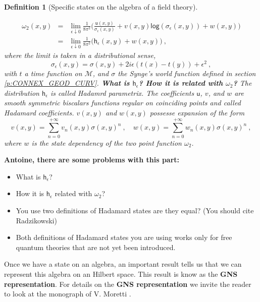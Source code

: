 \documentclass[11pt]{book}
\newcommand{\com}[1]{{\color{red}\bf #1}}
\renewcommand{\log}{\mathsf{log}}
\newcommand{\Mcal}{\mathcal{M}}
\newcommand{\hsf}{\mathsf{h}}
\newcommand{\usf}{\mathsf{u}}
\theoremstyle{break}
\newtheorem{definition}{Definition}[chapter]
\begin{document}
\begin{definition}[Specific states on the algebra of a field theory]
\begin{itemize}
%
\begin{eqnarray*}
\omega_2(x,y) &=& \lim_{\epsilon \downarrow 0} \frac{1}{8\pi^2} \bigg( \frac{\usf(x,y)}{\sigma_\epsilon(x,y)} + v(x,y) \log\left( \sigma_\epsilon(x,y) \right) + w(x,y) \bigg) \\
&=& \lim_{\epsilon \downarrow 0} \frac{1}{8\pi^2} \bigg( \hsf_\epsilon(x,y) + w(x,y) \bigg) \ ,
\end{eqnarray*}
where the limit is taken in a distributional sense, 
%
\begin{equation*}
\sigma_\epsilon(x,y) = \sigma(x,y) + 2 i \epsilon \left( t(x) -t(y)\right) + \epsilon^2 \ , 
\end{equation*}
%
with $t$ a time function on $\Mcal$, and $\sigma$ the Synge's world function defined in section \ref{p:CONNEX_GEOD_CURV}. 
\com{What is $\hsf_\epsilon$? How it is related with $\omega_2$? }
The distribution $\hsf_\epsilon$ is called Hadamrd parametrix. The coefficients $\usf$, $v$, and $w$ are smooth symmetric biscalars functions regular on coinciding points and called Hadamard coefficients. $v(x,y)$ and $w(x,y)$ possesse expansion of the form
%
\begin{equation*}
v(x,y) = \sum_{n=0}^{+\infty} v_n(x,y) \sigma(x,y)^n \ , \quad 
w(x,y) = \sum_{n=0}^{+\infty} w_n(x,y) \sigma(x,y)^n \ ,
\end{equation*}
%
where $w$ is the state dependency of the two point function $\omega_2$.
\end{itemize}
\end{definition}


\com{Antoine, there are some problems with this part:
\begin{itemize}
\item What is $\hsf_\epsilon$? 
\item How it is  $\hsf_\epsilon$ related with $\omega_2$?
\item You use two definitions of Hadamard states are they equal? (You should cite Radzikowski)
\item Both definitions of Hadamard states you are using works only for free quantum theories that are not yet been introduced.
\end{itemize}
}



Once we have a state on an algebra, an important result tells us that we can represent this algebra on an Hilbert space. This result is know as the \textbf{GNS representation}. For details on the \textbf{GNS representation} we invite the reader to look at the monograph of V. Moretti \cite{moretti_spectral_2013}.
\end{document}
